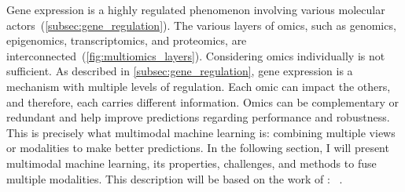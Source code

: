 \documentclass[../main.tex]{subfiles}
\begin{document}
	Gene expression is a highly regulated phenomenon involving various molecular actors~(\cref{subsec:gene_regulation}).
	The various layers of omics, such as genomics, epigenomics, transcriptomics, and proteomics, are interconnected~(\cref{fig:multiomics_layers}).
	Considering omics individually is not sufficient.
	As described in \cref{subsec:gene_regulation}, gene expression is a mechanism with multiple levels of regulation.
	Each omic can impact the others, and therefore, each carries different information.
	Omics can be complementary or redundant and help improve predictions regarding performance and robustness.
	This is precisely what multimodal machine learning is: combining multiple views or modalities to make better predictions.
	In the following section, I will present multimodal machine learning, its properties, challenges, and methods to fuse multiple modalities.
	This description will be based on the work of \citeauthor{MML_morency}: ~\cite{MML_morency}.
\end{document}
